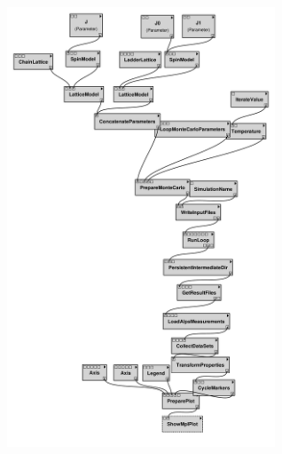 \href{http://alps.comp-phys.org/vistrails/download.php?getvt=10&db=vistrails&host=alps.ethz.ch&port=3306&tag=&execute=False&showspreadsheetonly=False&version=163}{\includegraphics[width=8cm]{vistrails_images/alps.ethz.ch_vistrails_3306_10_163_pdf_graph/graph_10_163.pdf}
}